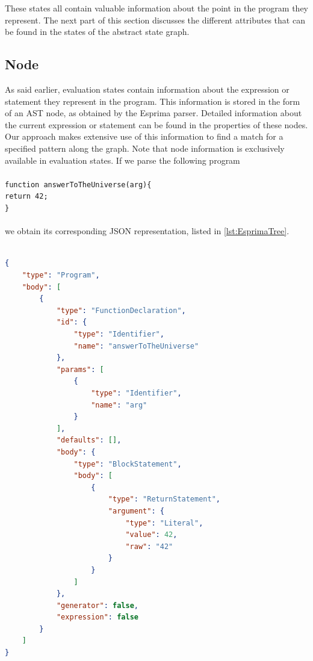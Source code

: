 These states all contain valuable information about the point in the program they represent. The next part of this section discusses the different attributes that can be found in the states of the abstract state graph. 

\subsection*{Node}

As said earlier, evaluation states contain information about the expression or statement they represent in the program. This information is stored in the form of an AST node, as obtained by the Esprima parser. Detailed information about the current expression or statement can be found in the properties of these nodes. Our approach makes extensive use of this information to find a match for a specified pattern along the graph. Note that node information is exclusively available in evaluation states. If we parse the following program \\\\
\texttt{function answerToTheUniverse(arg)\{}\\
\phantom{ }\phantom{ }\phantom{ }\phantom{ }\texttt{return 42;}\\
\texttt{\}}\\
\\
we obtain its corresponding JSON representation, listed in \ref{lst:EsprimaTree}.
\\
\begin{lstlisting}[label={lst:EsprimaTree},language=JSON,caption=Parsed JavaScript program AST, mathescape=true]  % float=t?

{
    "type": "Program",
    "body": [
        {
            "type": "FunctionDeclaration",
            "id": {
                "type": "Identifier",
                "name": "answerToTheUniverse"
            },
            "params": [
                {
                    "type": "Identifier",
                    "name": "arg"
                }
            ],
            "defaults": [],
            "body": {
                "type": "BlockStatement",
                "body": [
                    {
                        "type": "ReturnStatement",
                        "argument": {
                            "type": "Literal",
                            "value": 42,
                            "raw": "42"
                        }
                    }
                ]
            },
            "generator": false,
            "expression": false
        }
    ]
}
\end{lstlisting}

